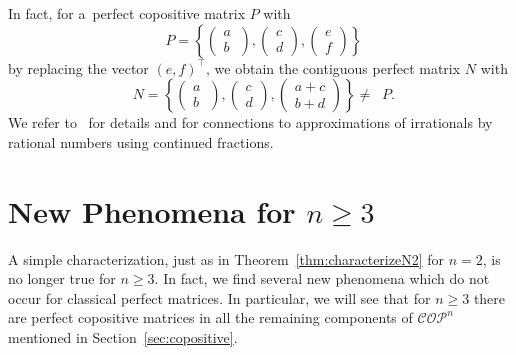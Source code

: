 \documentclass{commat}
\newcommand{\cop}{{\mathcal{COP}}}
\newcommand{\copn}{{\mathcal{COP}}^{n}}
\DeclareMathOperator{\MinC}{Min_{\cop}}
\begin{document}
In fact, for a~perfect copositive matrix $P$ with
\[
    \MinC P=\left\{
    \begin{pmatrix}
a~\\ b
\end{pmatrix}
,
    \begin{pmatrix}
c \\ d
\end{pmatrix}
,
    \begin{pmatrix}
e \\ f
\end{pmatrix}
    \right\}
\]
by replacing the vector \({(e, f)}^\intercal \), we obtain the contiguous perfect matrix $N$ with
\[
    \MinC N=\left\{
    \begin{pmatrix}
a~\\ b
\end{pmatrix}
,
    \begin{pmatrix}
c \\ d
\end{pmatrix}
,
    \begin{pmatrix}
a+c \\ b+d
\end{pmatrix}
    \right\}\neq\MinC P.
\]
We refer to~\cite{dsv-2021} for details and for connections to
approximations of irrationals by rational numbers using continued fractions.


\section{New Phenomena for \texorpdfstring{\(n \geq 3 \)}{n>=3}}\label{sec:newphenomenaN3}

A simple characterization, just as in Theorem~\ref{thm:characterizeN2} for \(n=2 \),
is no longer true for \(n \geq 3 \).
In fact, we find several new phenomena which do not occur for classical perfect matrices.
In particular, we will see that for \(n\geq 3 \) there are perfect copositive matrices in
all the remaining components of \(\copn \) mentioned in Section~\ref{sec:copositive}.
\end{document}
